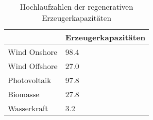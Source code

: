 {
\renewcommand{\arraystretch}{1.2}%
\begin{table}[H]
	\begin{center}
		\caption{Hochlaufzahlen der regenerativen Erzeugerkapazitäten}
		\begin{tabu} to 0.45\textwidth {X[1] X[1.5, r]}
			\toprule
			              & Erzeugerkapazitäten \\ \midrule
			Wind Onshore  & \SI{98.4}{\gw}                      \\
			Wind Offshore & \SI{27.0}{\gw}                      \\
			Photovoltaik  & \SI{97.8}{\gw}                      \\
			Biomasse      & \SI{27.8}{\gw}                      \\
			Wasserkraft   & \SI{3.2}{\gw}                       \\ \bottomrule
		\end{tabu}
		\label{tab:EE-RampUp}
	\end{center}
	\vspace{-3mm}%
\end{table}
}